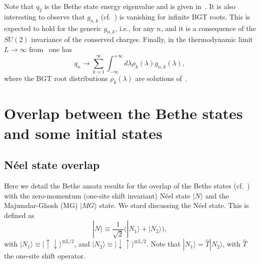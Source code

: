 \documentclass[11pt]{iopart}
\begin{document}
%
Note that $q_2$ is the Bethe state energy eigenvalue and is given in~. 
It is also interesting to observe that $g_{n,k}$ (cf.~) is vanishing for 
infinite BGT roots. This is expected to hold for the generic $g_{n,k}$, i.e., for any 
$n$, and it is a consequence of the $SU(2)$ invariance of the conserved charges. Finally, 
in the thermodynamic limit $L\to\infty$ from~ one has 
%
\begin{equation}
\label{q0-th}
q_n\to\sum_{k=1}^\infty\int_{-\infty}^{+\infty}d\lambda\rho_k(\lambda)g_{n,k}(\lambda), 
\end{equation}
%
where the BGT root distributions $\rho_k(\lambda)$ are solutions of~. 



\section{Overlap between the Bethe states and some initial states} 
\label{sec:2}

\subsection{N\'eel state overlap}
\label{sec:2.1}

Here we detail the Bethe ansatz results for the overlap of the Bethe states (cf.~) 
with the zero-momentum (one-site shift invariant) N\'eel state $|N\rangle$ and the 
Majumdar-Ghosh (MG) $|MG\rangle$ state. We stard discussing the N\'eel state. This is 
defined as 
%
\begin{equation}
\label{neel}
|N\rangle\equiv\frac{1}{\sqrt{2}}\big(|N_1\rangle
+|N_2\rangle\big), 
\end{equation}
%
with $|N_1\rangle\equiv |\uparrow\downarrow\rangle^{\otimes L/2}$, and $|N_2\rangle\equiv 
|\downarrow\uparrow\rangle^{\otimes L/2}$. Note that $|N_1\rangle=\hat T|N_2\rangle$, 
with $\hat T$ the one-site shift operator. 
\end{document}
